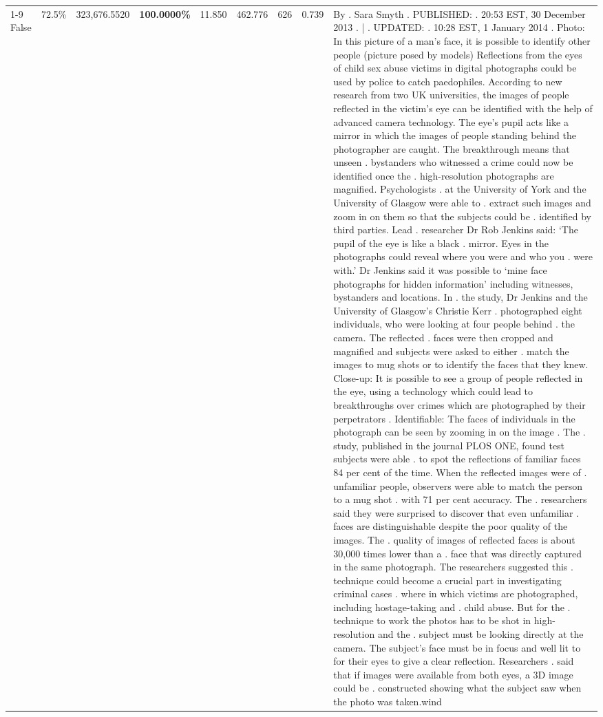 \begin{table}[H]
\begin{tabular}{lllrlllll}
\cline{1-9}
False & 72.5\% & 323,676.5520 & \bfseries \color{red} 100.0000\% & 11.850 & 462.776 & 626 & 0.739 & By . Sara Smyth . PUBLISHED: . 20:53 EST, 30 December 2013 . | . UPDATED: . 10:28 EST, 1 January 2014 . Photo: In this picture of a man's face, it is possible to identify other people (picture posed by models) Reflections from the eyes of child sex abuse victims in digital photographs could be used by police to catch paedophiles. According to new research from two UK universities, the images of people reflected in the victim's eye can be identified with the help of advanced camera technology. The eye's pupil acts like a mirror in which the images of people standing behind the photographer are caught. The breakthrough means that unseen . bystanders who witnessed a crime could now be identified once the . high-resolution photographs are magnified. Psychologists . at the University of York and the University of Glasgow were able to . extract such images and zoom in on them so that the subjects could be . identified by third parties. Lead . researcher Dr Rob Jenkins said: ‘The pupil of the eye is like a black . mirror. Eyes in the photographs could reveal where you were and who you . were with.' Dr Jenkins said it was possible to ‘mine face photographs for hidden information' including witnesses, bystanders and locations. In . the study, Dr Jenkins and the University of Glasgow's Christie Kerr . photographed eight individuals, who were looking at four people behind . the camera. The reflected . faces were then cropped and magnified and subjects were asked to either . match the images to mug shots or to identify the faces that they knew. Close-up: It is possible to see a group of people reflected in the eye, using a technology which could lead to breakthroughs over crimes which are photographed by their perpetrators . Identifiable: The faces of individuals in the photograph can be seen by zooming in on the image . The . study, published in the journal PLOS ONE, found test subjects were able . to spot the reflections of familiar faces 84 per cent of the time. When the reflected images were of . unfamiliar people, observers were able to match the person to a mug shot . with 71 per cent accuracy. The . researchers said they were surprised to discover that even unfamiliar . faces are distinguishable despite the poor quality of the images. The . quality of images of reflected faces is about 30,000 times lower than a . face that was directly captured in the same photograph. The researchers suggested this . technique could become a crucial part in investigating criminal cases . where in which victims are photographed, including hostage-taking and . child abuse. But for the . technique to work the photos has to be shot in high-resolution and the . subject must be looking directly at the camera. The subject's face must be in focus and well lit to for their eyes to give a clear reflection. Researchers . said that if images were available from both eyes, a 3D image could be . constructed showing what the subject saw when the photo was taken.wind \\

\end{tabular}
\end{table}
